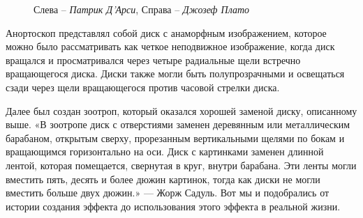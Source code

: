 \documentclass[a4paper, 12pt]{article}
\begin{document}
\begin{figure}[ht]
  \caption{Слева -- \textit{Патрик Д'Арси}, Справа -- \textit{Джозеф Плато}}
\end{figure}

Анортоскоп представлял собой диск с анаморфным изображением,
которое можно было рассматривать как четкое неподвижное
изображение, когда диск вращался и просматривался через четыре
радиальные щели встречно вращающегося диска. Диски также могли
быть полупрозрачными и освещаться сзади через щели вращающегося
против часовой стрелки диска.

Далее был создан зоотроп, который оказался хорошей заменой
диску, описанному выше. «В зоотропе диск с отверстиями заменен
деревянным или металлическим барабаном, открытым сверху,
прорезанным вертикальными щелями по бокам и вращающимся
горизонтально на оси. Диск с картинками заменен длинной лентой,
которая помещается, свернутая в круг, внутри барабана. Эти ленты
могли вместить пять, десять и более дюжин картинок, тогда как диски
не могли вместить больше двух дюжин.» — Жорж Садуль. Вот мы и
подобрались от истории создания эффекта до использования этого
эффекта в реальной жизни.
\end{document}
